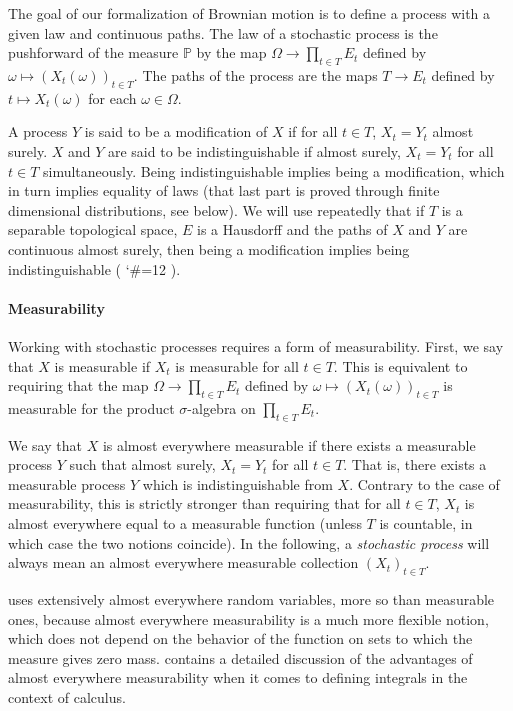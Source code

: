 \documentclass[lean]{Draft}
\makeatletter
\newcommand\leanlink{\begingroup\catcode`\#=12\relax\@leanlink}
\newcommand\@leanlink[2]{\endgroup
\href{#1}
{\texttt{\detokenize{#2}}}}
\newcommand{\docs}[1]{%
\leanlink{https://remydegenne.github.io/brownian-motion/docs/find/?pattern=#1\#doc}
{#1}}
\makeatother
\begin{document}
The goal of our formalization of Brownian motion is to define a process with a given law and continuous paths.
The law of a stochastic process is the pushforward of the measure $\mathbb{P}$ by the map $\Omega \to \prod_{t \in T} E_t$ defined by $\omega \mapsto (X_t(\omega))_{t \in T}$.
The paths of the process are the maps $T \to E_t$ defined by $t \mapsto X_t(\omega)$ for each $\omega \in \Omega$.

A process $Y$ is said to be a modification of $X$ if for all $t \in T$, $X_t = Y_t$ almost surely.
$X$ and $Y$ are said to be indistinguishable if almost surely, $X_t = Y_t$ for all $t \in T$ simultaneously.
Being indistinguishable implies being a modification, which in turn implies equality of laws (that last part is proved through finite dimensional distributions, see below).
We will use repeatedly that if $T$ is a separable topological space, $E$ is a Hausdorff and the paths of $X$ and $Y$ are continuous almost surely, then being a modification implies being indistinguishable (\docs{indistinguishable_of_modification}).


\paragraph{Measurability}

Working with stochastic processes requires a form of measurability.
First, we say that $X$ is measurable if $X_t$ is measurable for all $t \in T$.
This is equivalent to requiring that the map $\Omega \to \prod_{t \in T} E_t$ defined by $\omega \mapsto (X_t(\omega))_{t \in T}$ is measurable for the product $\sigma$-algebra on $\prod_{t \in T} E_t$.

We say that $X$ is almost everywhere measurable if there exists a measurable process $Y$ such that almost surely, $X_t = Y_t$ for all $t \in T$.
That is, there exists a measurable process $Y$ which is indistinguishable from $X$.
Contrary to the case of measurability, this is strictly stronger than requiring that for all $t \in T$, $X_t$ is almost everywhere equal to a measurable function (unless $T$ is countable, in which case the two notions coincide).
In the following, a \emph{stochastic process} will always mean an almost everywhere measurable collection $(X_t)_{t \in T}$.

\mathlib uses extensively almost everywhere random variables, more so than measurable ones, because almost everywhere measurability is a much more flexible notion, which does not depend on the behavior of the function on sets to which the measure gives zero mass.
\cite{gouezel2022formalization} contains a detailed discussion of the advantages of almost everywhere measurability when it comes to defining integrals in the context of calculus.
\end{document}

